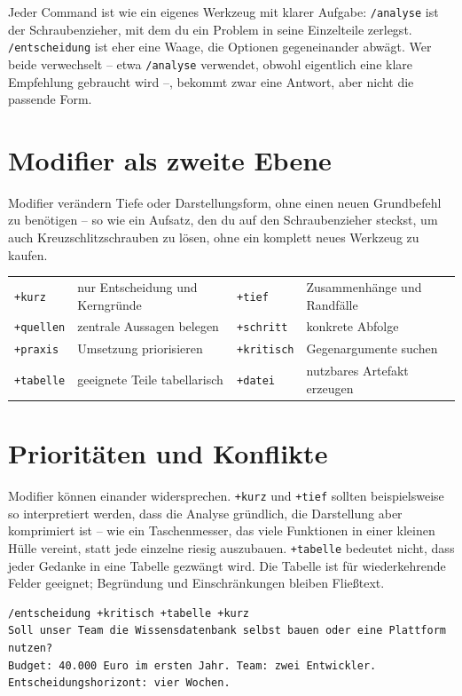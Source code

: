 Jeder Command ist wie ein eigenes Werkzeug mit klarer Aufgabe: \texttt{/analyse} ist der Schraubenzieher, mit dem du ein Problem in seine Einzelteile zerlegst. \texttt{/entscheidung} ist eher eine Waage, die Optionen gegeneinander abwägt. Wer beide verwechselt -- etwa \texttt{/analyse} verwendet, obwohl eigentlich eine klare Empfehlung gebraucht wird --, bekommt zwar eine Antwort, aber nicht die passende Form.

\section{Modifier als zweite Ebene}

Modifier verändern Tiefe oder Darstellungsform, ohne einen neuen Grundbefehl zu benötigen -- so wie ein Aufsatz, den du auf den Schraubenzieher steckst, um auch Kreuzschlitzschrauben zu lösen, ohne ein komplett neues Werkzeug zu kaufen.

\begin{tabularx}{\textwidth}{@{}lXlX@{}}\toprule
\texttt{+kurz}&nur Entscheidung und Kerngründe&\texttt{+tief}&Zusammenhänge und Randfälle\\
\texttt{+quellen}&zentrale Aussagen belegen&\texttt{+schritt}&konkrete Abfolge\\
\texttt{+praxis}&Umsetzung priorisieren&\texttt{+kritisch}&Gegenargumente suchen\\
\texttt{+tabelle}&geeignete Teile tabellarisch&\texttt{+datei}&nutzbares Artefakt erzeugen\\\bottomrule
\end{tabularx}

\section{Prioritäten und Konflikte}

Modifier können einander widersprechen. \texttt{+kurz} und \texttt{+tief} sollten beispielsweise so interpretiert werden, dass die Analyse gründlich, die Darstellung aber komprimiert ist -- wie ein Taschenmesser, das viele Funktionen in einer kleinen Hülle vereint, statt jede einzelne riesig auszubauen. \texttt{+tabelle} bedeutet nicht, dass jeder Gedanke in eine Tabelle gezwängt wird. Die Tabelle ist für wiederkehrende Felder geeignet; Begründung und Einschränkungen bleiben Fließtext.

\begin{lstlisting}
/entscheidung +kritisch +tabelle +kurz
Soll unser Team die Wissensdatenbank selbst bauen oder eine Plattform nutzen?
Budget: 40.000 Euro im ersten Jahr. Team: zwei Entwickler.
Entscheidungshorizont: vier Wochen.
\end{lstlisting}

